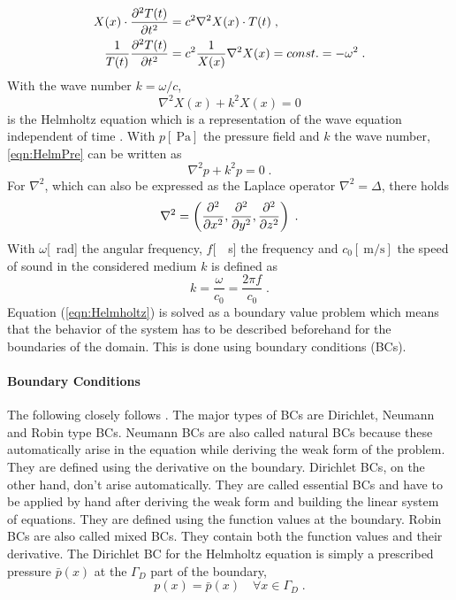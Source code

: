 \documentclass[%
  a4paper,oneside,%
  11pt,%
  smallchapters,
  style=printdev,
  extramargin,
  green,%
  rgb, <cmyk>
  ]{tubsbook}
\begin{document}
\begin{align}
X(x) \cdot \pdv[2]{T(t)}{t} &= c^2 \nabla^2 X(x) \cdot T(t)\;,\\
\frac{1}{T(t)} \pdv[2]{T(t)}{t} &= c^2 \frac{1}{X(x)} \nabla^2 X(x) = const. = - \omega^2 \; .
\end{align}
With the wave number $k = \omega / c$,
\begin{equation}
\nabla^2 X(x) + k^2 X(x) = 0
\label{eqn:HelmPre}
\end{equation}
is the Helmholtz equation which is a representation of the wave equation independent of time \cite[p. 1083 ff.]{arens2015}.
%
With $p [\SI{}{\pascal}]$ the pressure field and $k$ the wave number, \eqref{eqn:HelmPre} can be written as
\begin{equation}
\nabla^2 p + k^2 p = 0 \;.
\label{eqn:Helmholtz}
\end{equation}
For $\nabla^2$, which can also be expressed as the Laplace operator $\nabla^2 = \Delta$, there holds
\begin{equation}
\nabla^2 = \left( \pdv[2]{}{x},\pdv[2]{}{y},\pdv[2]{}{z} \right) \;.
\end{equation}
With $\omega$[\SI{}{\radian}] the angular frequency, $f$[\SI{}{\per\s}] the frequency and $c_0[\SI{}{\metre\per\s}]$ the speed of sound in the considered medium $k$ is defined as
\begin{equation}
k = \frac{\omega}{c_0} = \frac{2 \pi f}{c_0} \;.
\end{equation}
Equation (\ref{eqn:Helmholtz}) is solved as a boundary value problem which means that the behavior of the system has to be described beforehand for the boundaries of the domain. This is done using boundary conditions (BCs).



\paragraph{Boundary Conditions}
The following closely follows \cite[p. 10 ff.]{atalla2015}. The major types of BCs are Dirichlet, Neumann and Robin type BCs. Neumann BCs are also called natural BCs because these automatically arise in the equation while deriving the weak form of the problem. They are defined using the derivative on the boundary. Dirichlet BCs, on the other hand, don't arise automatically. They are called essential BCs and have to be applied by hand after deriving the weak form and building the linear system of equations. They are defined using the function values at the boundary. Robin BCs are also called mixed BCs. They contain both the function values and their derivative.
The Dirichlet BC for the Helmholtz equation is simply a prescribed pressure $\bar{p}(x)$ at the $\Gamma_D$ part of the boundary,
\begin{equation}
p(x) = \bar{p}(x) \quad \forall x \in \Gamma_D \;.
\end{equation}
\end{document}
